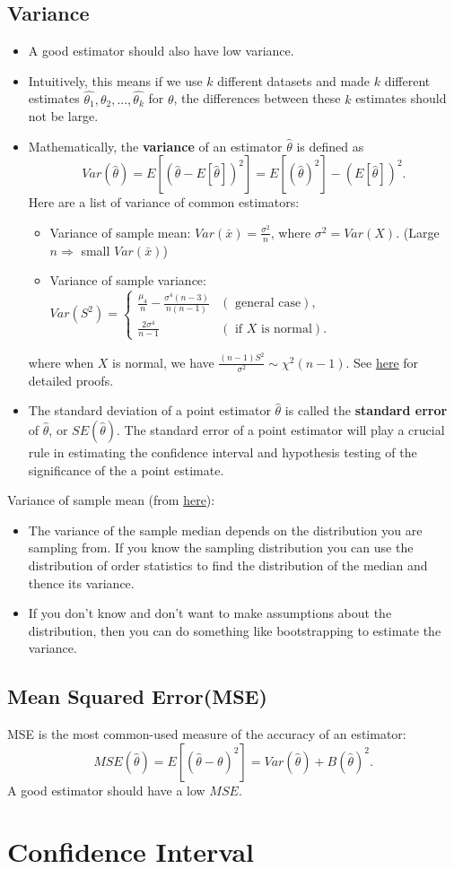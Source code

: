 \documentclass[twoside,12pt]{article}
\begin{document}
\subsection{Variance}
\begin{itemize}
\item A good estimator should also have low variance. 
\item Intuitively, this means if we use $k$ different datasets and made $k$ different estimates $\hat{\theta_1}, \hat{\theta_2}, ..., \hat{\theta_k}$ for $\theta$, the differences between these $k$ estimates should not be large. 
\item Mathematically, the \textbf{variance} of an estimator $\hat{\theta}$ is defined as $$Var(\hat{\theta}) = E[(\hat{\theta} - E[\hat{\theta}])^2] = E[(\hat{\theta})^2] - (E[\hat{\theta}])^2.$$
Here are a list of variance of common estimators:
\begin{itemize}
\item Variance of sample mean: $Var(\bar{x}) = \frac{\sigma ^2}{n}$, where $\sigma^2 = Var(X)$. (Large $n \Rightarrow$ small $Var(\bar{x})$)
\item Variance of sample variance: $Var(S^2) = \left\{ \begin{array}{lcr} \frac{\mu_4}{n} - \frac{\sigma^4(n-3)}{n(n-1)} & (\mbox{ general case}),\\ \frac{2 \sigma^4}{n-1} & (\mbox{ if } X \mbox{ is normal}).\end{array}\right. $
\end{itemize}
where when $X$ is normal, we have $\frac{(n-1)S^2}{\sigma^2} \sim \chi^2(n-1)$. See \href{https://math.stackexchange.com/questions/72975/variance-of-sample-variance}{here} for detailed proofs.
\item The standard deviation of a point estimator $\hat{\theta}$ is called the \textbf{standard error} of $\hat{\theta}$, or $SE(\hat{\theta})$. The standard error of a point estimator will play a crucial rule in estimating the confidence interval and hypothesis testing of the significance of the a point estimate. 
\end{itemize}
\begin{tcolorbox}
Variance of sample mean (from \href{https://stats.stackexchange.com/questions/41557/variance-of-sample-median}{here}):
\begin{itemize}
\item The variance of the sample median depends on the distribution you are sampling from. If you know the sampling distribution you can use the distribution of order statistics to find the distribution of the median and thence its variance.
\item If you don't know and don't want to make assumptions about the distribution, then you can do something like bootstrapping to estimate the variance.
\end{itemize}
\end{tcolorbox}
\subsection{Mean Squared Error(MSE)}
MSE is the most common-used measure of the accuracy of an estimator:
$$MSE(\hat{\theta}) = E[(\hat{\theta} - \theta)^2] = Var(\hat{\theta}) + B(\hat{\theta})^2.$$
A good estimator should have a low $MSE$.

\section{Confidence Interval}
\end{document}
